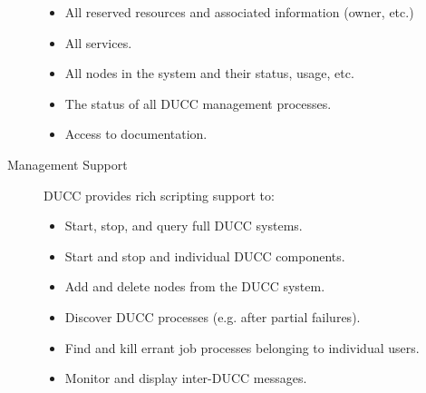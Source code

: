 \begin{description}
\begin{itemize}
              \item All reserved resources and associated information (owner, etc.)
                
              \item All services.
                
              \item All nodes in the system and their status, usage, etc. 
                                
              \item The status of all DUCC management processes.  

              \item Access to documentation.
          \end{itemize}


        \item[Management Support] DUCC provides rich scripting support to:
          \begin{itemize}
              \item Start, stop, and query full DUCC systems.
 
              \item Start and stop and individual DUCC components.
 
              \item Add and delete nodes from the DUCC system.
 
              \item Discover DUCC processes (e.g. after partial failures).
 
              \item Find and kill errant job processes belonging to individual users.
                
              \item Monitor and display inter-DUCC messages.
          \end{itemize}
      \end{description}

